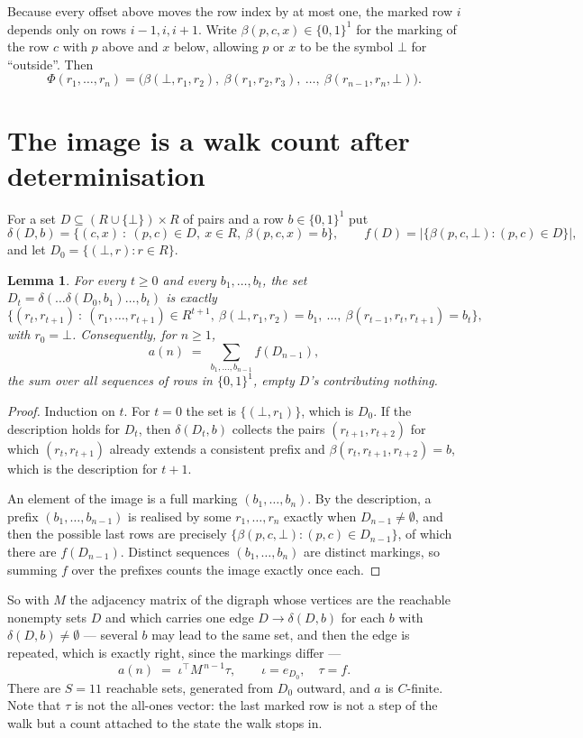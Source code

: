 \documentclass[11pt,a4paper]{article}
\theoremstyle{plain}
\newtheorem{lemma}[theorem]{Lemma}
\theoremstyle{definition}
\begin{document}
Because every offset above moves the row index by at most one, the marked row $i$ depends only
on rows $i-1,i,i+1$. Write $\beta(p,c,x)\in\{0,1\}^{1}$ for the marking of the row $c$
with $p$ above and $x$ below, allowing $p$ or $x$ to be the symbol $\bot$ for ``outside''.
Then
\[
\Phi(r_1,\dots,r_n)=\bigl(\beta(\bot,r_1,r_2),\ \beta(r_1,r_2,r_3),\ \dots,\
\beta(r_{n-1},r_n,\bot)\bigr).
\]

\section{The image is a walk count after determinisation}

For a set $D\subseteq(R\cup\{\bot\})\times R$ of pairs and a row $b\in\{0,1\}^{1}$ put
\[
\delta(D,b)=\{(c,x)\ :\ (p,c)\in D,\ x\in R,\ \beta(p,c,x)=b\},\qquad
f(D)=\bigl|\{\beta(p,c,\bot):(p,c)\in D\}\bigr| ,
\]
and let $D_0=\{(\bot,r):r\in R\}$.

\begin{lemma}\label{lem:det}
For every $t\ge0$ and every $b_1,\dots,b_t$, the set
$D_t=\delta(\dots\delta(D_0,b_1)\dots,b_t)$ is exactly
\[
\{(r_t,r_{t+1})\ :\ (r_1,\dots,r_{t+1})\in R^{t+1},\ \beta(\bot,r_1,r_2)=b_1,\ \dots,\
\beta(r_{t-1},r_t,r_{t+1})=b_t\} ,
\]
with $r_0=\bot$. Consequently, for $n\ge1$,
\[
a(n)\;=\;\sum_{b_1,\dots,b_{n-1}}f(D_{n-1}),
\]
the sum over all sequences of rows in $\{0,1\}^{1}$, empty $D$'s contributing nothing.
\end{lemma}

\begin{proof}
Induction on $t$. For $t=0$ the set is $\{(\bot,r_1)\}$, which is $D_0$. If the description
holds for $D_t$, then $\delta(D_t,b)$ collects the pairs $(r_{t+1},r_{t+2})$ for which
$(r_t,r_{t+1})$ already extends a consistent prefix and
$\beta(r_t,r_{t+1},r_{t+2})=b$, which is the description for $t+1$.

An element of the image is a full marking $(b_1,\dots,b_n)$. By the description, a prefix
$(b_1,\dots,b_{n-1})$ is realised by some $r_1,\dots,r_n$ exactly when $D_{n-1}\neq
\emptyset$, and then the possible last rows are precisely
$\{\beta(p,c,\bot):(p,c)\in D_{n-1}\}$, of which there are $f(D_{n-1})$. Distinct
sequences $(b_1,\dots,b_n)$ are distinct markings, so summing $f$ over the prefixes counts the
image exactly once each.
\end{proof}

So with $M$ the adjacency matrix of the digraph whose vertices are the reachable nonempty sets
$D$ and which carries one edge $D\to\delta(D,b)$ for each $b$ with $\delta(D,b)\neq\emptyset$
--- several $b$ may lead to the same set, and then the edge is repeated, which is exactly
right, since the markings differ ---
\[
a(n)\;=\;\iota^{\!\top}M^{\,n-1}\tau,\qquad \iota=e_{D_0},\quad \tau=f .
\]
There are $S=11$ reachable sets, generated from $D_0$ outward, and $a$ is $C$-finite. Note
that $\tau$ is not the all-ones vector: the last marked row is not a step of the walk but a
count attached to the state the walk stops in.
\end{document}
